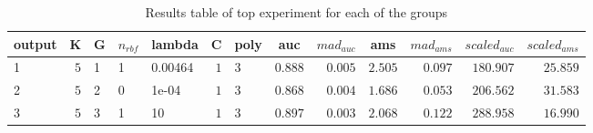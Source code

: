 \begin{table}[!tbp]
\caption{Results table of top experiment for each of the groups\label{table:results}} 
\begin{center}
\begin{tabular}{lrlllrlrrrrrr}
\hline\hline
\multicolumn{1}{l}{output}&\multicolumn{1}{c}{K}&\multicolumn{1}{c}{G}&\multicolumn{1}{c}{$n_{rbf}$}&\multicolumn{1}{c}{lambda}&\multicolumn{1}{c}{C}&\multicolumn{1}{c}{poly}&\multicolumn{1}{c}{auc}&\multicolumn{1}{c}{$mad_{auc}$}&\multicolumn{1}{c}{ams}&\multicolumn{1}{c}{$mad_{ams}$}&\multicolumn{1}{c}{$scaled_{auc}$}&\multicolumn{1}{c}{$scaled_{ams}$}\tabularnewline
\hline
1&$5$&1&1&0.00464&$1$&3&$0.888$&$0.005$&$2.505$&$0.097$&$180.907$&$25.859$\tabularnewline
2&$5$&2&0&1e-04&$1$&3&$0.868$&$0.004$&$1.686$&$0.053$&$206.562$&$31.583$\tabularnewline
3&$5$&3&1&10&$1$&3&$0.897$&$0.003$&$2.068$&$0.122$&$288.958$&$16.990$\tabularnewline
\hline
\end{tabular}\end{center}
\end{table}
